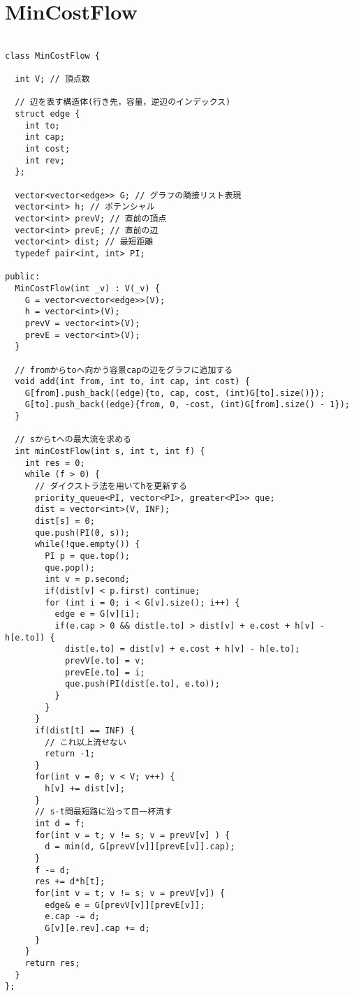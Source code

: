 \documentclass[a4j,titlepage]{jarticle} %
\begin{document}
\section{MinCostFlow}
\color{black}
\begin{lstlisting}[caption=MinCostFlow]

class MinCostFlow {

  int V; // 頂点数

  // 辺を表す構造体(行き先，容量，逆辺のインデックス)
  struct edge {
    int to;
    int cap;
    int cost;
    int rev;
  };

  vector<vector<edge>> G; // グラフの隣接リスト表現
  vector<int> h; // ポテンシャル
  vector<int> prevV; // 直前の頂点
  vector<int> prevE; // 直前の辺
  vector<int> dist; // 最短距離
  typedef pair<int, int> PI;

public:
  MinCostFlow(int _v) : V(_v) {
    G = vector<vector<edge>>(V);
    h = vector<int>(V);
    prevV = vector<int>(V);
    prevE = vector<int>(V);
  }

  // fromからtoへ向かう容景capの辺をグラフに追加する
  void add(int from, int to, int cap, int cost) {
    G[from].push_back((edge){to, cap, cost, (int)G[to].size()});
    G[to].push_back((edge){from, 0, -cost, (int)G[from].size() - 1});
  }

  // sからtへの最大流を求める
  int minCostFlow(int s, int t, int f) {
    int res = 0;
    while (f > 0) {
      // ダイクストラ法を用いてhを更新する
      priority_queue<PI, vector<PI>, greater<PI>> que;
      dist = vector<int>(V, INF);
      dist[s] = 0;
      que.push(PI(0, s));
      while(!que.empty()) {
        PI p = que.top();
        que.pop();
        int v = p.second;
        if(dist[v] < p.first) continue;
        for (int i = 0; i < G[v].size(); i++) {
          edge e = G[v][i];
          if(e.cap > 0 && dist[e.to] > dist[v] + e.cost + h[v] - h[e.to]) {
            dist[e.to] = dist[v] + e.cost + h[v] - h[e.to];
            prevV[e.to] = v;
            prevE[e.to] = i;
            que.push(PI(dist[e.to], e.to));
          }
        }
      }
      if(dist[t] == INF) {
        // これ以上流せない
        return -1;
      }
      for(int v = 0; v < V; v++) {
        h[v] += dist[v];
      }
      // s-t問最短路に沿って目一杯流す
      int d = f;
      for(int v = t; v != s; v = prevV[v] ) {
        d = min(d, G[prevV[v]][prevE[v]].cap);
      }
      f -= d;
      res += d*h[t];
      for(int v = t; v != s; v = prevV[v]) {
        edge& e = G[prevV[v]][prevE[v]];
        e.cap -= d;
        G[v][e.rev].cap += d;
      }
    }
    return res;
  }
};

\end{lstlisting}
\end{document}
